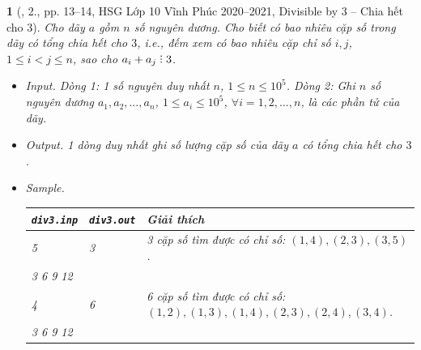 \documentclass{article}
\newtheorem{baitoan}{}
\DeclareRobustCommand{\divby}{%
	\mathrel{\vbox{\baselineskip.65ex\lineskiplimit0pt\hbox{.}\hbox{.}\hbox{.}}}%
}
\begin{document}
\begin{baitoan}[\cite{Trung_HSG_THPT_Tin}, 2., pp. 13--14, HSG Lớp 10 Vĩnh Phúc 2020--2021, Divisible by 3 -- Chia hết cho 3]
	Cho dãy $a$ gồm $n$ số nguyên dương. Cho biết có bao nhiêu cặp số trong dãy có tổng chia hết cho $3$, i.e., đếm xem có bao nhiêu cặp chỉ số $i,j$, $1\le i < j\le n$, sao cho $a_i + a_j\divby3$.
	\begin{itemize}
		\item {\sf Input.} Dòng 1: 1 số nguyên duy nhất $n$, $1\le n\le10^5$. Dòng 2: Ghi $n$ số nguyên dương $a_1,a_2,\ldots,a_n$, $1\le a_i\le10^5$, $\forall i = 1,2,\ldots,n$, là các phần tử của dãy.
		\item {\sf Output.} 1 dòng duy nhất ghi số lượng cặp số của dãy $a$ có tổng chia hết cho $3$.
		\item {\sf Sample.}
		\begin{table}[H]
			\centering
			\begin{tabular}{|l|l|l|}
				\hline
				{\tt div3.inp} & {\tt div3.out} & Giải thích \\
				\hline
				5 & 3 & 3 cặp số tìm được có chỉ số: $(1,4),(2,3),(3,5)$. \\
				3 6 9 12 & & \\
				\hline
				4 & 6 & 6 cặp số tìm được có chỉ số: $(1,2),(1,3),(1,4),(2,3),(2,4),(3,4)$. \\
				3 6 9 12 & & \\
				\hline
			\end{tabular}
		\end{table}
	\end{itemize}
\end{baitoan}
\end{document}
